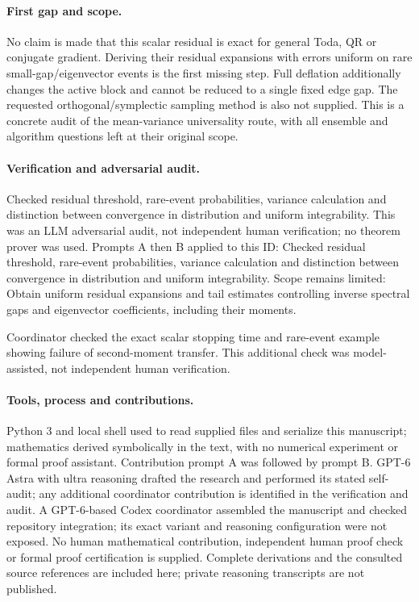 \documentclass[11pt]{article}
\begin{document}
\paragraph{First gap and scope.}No claim is made that this scalar residual is exact for general Toda, QR or conjugate gradient. Deriving their residual expansions with errors uniform on rare small-gap/eigenvector events is the first missing step. Full deflation additionally changes the active block and cannot be reduced to a single fixed edge gap. The requested orthogonal/symplectic sampling method is also not supplied. This is a concrete audit of the mean-variance universality route, with all ensemble and algorithm questions left at their original scope.

\paragraph{Verification and adversarial audit.}
Checked residual threshold, rare-event probabilities, variance calculation and distinction between convergence in distribution and uniform integrability. This was an LLM adversarial audit, not independent human verification; no theorem prover was used. Prompts A then B applied to this ID: Checked residual threshold, rare-event probabilities, variance calculation and distinction between convergence in distribution and uniform integrability. Scope remains limited: Obtain uniform residual expansions and tail estimates controlling inverse spectral gaps and eigenvector coefficients, including their moments.

Coordinator checked the exact scalar stopping time and rare-event example showing failure of second-moment transfer. This additional check was model-assisted, not independent human verification.

\paragraph{Tools, process and contributions.}
Python 3 and local shell used to read supplied files and serialize this manuscript; mathematics derived symbolically in the text, with no numerical experiment or formal proof assistant. Contribution prompt A was followed by prompt B. GPT-6 Astra with ultra reasoning drafted the research and performed its stated self-audit; any additional coordinator contribution is identified in the verification and audit. A GPT-6-based Codex coordinator assembled the manuscript and checked repository integration; its exact variant and reasoning configuration were not exposed. No human mathematical contribution, independent human proof check or formal proof certification is supplied. Complete derivations and the consulted source references are included here; private reasoning transcripts are not published.
\end{document}
